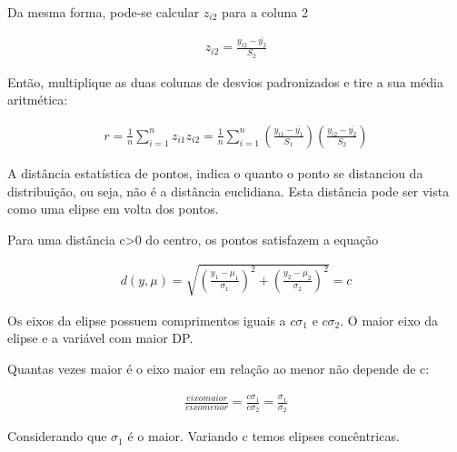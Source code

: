 \documentclass[11pt,a4paper]{article}
\begin{document}
		Da mesma forma, pode-se calcular $z_{i2}$ para a coluna 2
		
		\begin{eqnarray*}
			z_{i2}=\frac{y_{i2}-\bar{y_2}}{S_2}
		\end{eqnarray*}
		
		Então, multiplique as duas colunas de desvios padronizados e tire a sua média aritmética:
		
		\begin{eqnarray*}
			r=\frac{1}{n}\sum_{i=1}^{n}z_{i1}z_{i2}=\frac{1}{n}\sum_{i=1}^{n}(\frac{y_{i1}-\bar{y_1}}{S_1})(\frac{y_{i2}-\bar{y_2}}{S_2})
		\end{eqnarray*}
		
		A distância estatística de pontos, indica o quanto o ponto se distanciou da distribuição, ou seja, não é a distância euclidiana.
		Esta distância pode ser vista como uma elipse em volta dos pontos.
		
		Para uma distância c>0 do centro, os pontos satisfazem a equação
		
		\begin{eqnarray*}
			d(y,\mu)=\sqrt{(\frac{y_1-\mu_1}{\sigma_1})^2+(\frac{y_2-\mu_2}{\sigma_2})^2}=c
		\end{eqnarray*}
		
		Os eixos da elipse possuem comprimentos iguais a $c\sigma_1$ e $c\sigma_2$.
		O maior eixo da elipse e a variável com maior DP.
		
		Quantas vezes maior é o eixo maior em relação ao menor não depende de c:
		
		\begin{eqnarray*}
			\frac{eixo maior}{eixo menor}=\frac{c\sigma_1}{c\sigma_2}=\frac{\sigma_1}{\sigma_2}
		\end{eqnarray*}
		
		Considerando que $\sigma_1$ é o maior.
		Variando c temos elipses concêntricas.
		
\end{document}
